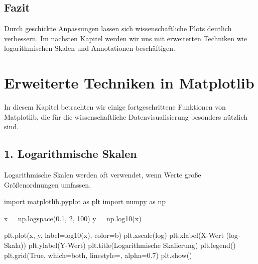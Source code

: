 \documentclass[
  letterpaper,
  DIV=11,
  numbers=noendperiod]{scrreprt}
\newenvironment{Shaded}{\begin{snugshade}}{\end{snugshade}}
\newcommand{\DecValTok}[1]{\textcolor[rgb]{0.68,0.00,0.00}{#1}}
\newcommand{\FloatTok}[1]{\textcolor[rgb]{0.68,0.00,0.00}{#1}}
\newcommand{\ImportTok}[1]{\textcolor[rgb]{0.00,0.46,0.62}{#1}}
\newcommand{\NormalTok}[1]{\textcolor[rgb]{0.00,0.23,0.31}{#1}}
\newcommand{\OperatorTok}[1]{\textcolor[rgb]{0.37,0.37,0.37}{#1}}
\newcommand{\StringTok}[1]{\textcolor[rgb]{0.13,0.47,0.30}{#1}}
\newcommand{\VariableTok}[1]{\textcolor[rgb]{0.07,0.07,0.07}{#1}}
\begin{document}
\section{Fazit}\label{fazit-1}

Durch geschickte Anpassungen lassen sich wissenschaftliche Plots
deutlich verbessern. Im nächsten Kapitel werden wir uns mit erweiterten
Techniken wie logarithmischen Skalen und Annotationen beschäftigen.

\chapter{Erweiterte Techniken in
Matplotlib}\label{erweiterte-techniken-in-matplotlib}

In diesem Kapitel betrachten wir einige fortgeschrittene Funktionen von
Matplotlib, die für die wissenschaftliche Datenvisualisierung besonders
nützlich sind.

\section{1. Logarithmische Skalen}\label{logarithmische-skalen}

Logarithmische Skalen werden oft verwendet, wenn Werte große
Größenordnungen umfassen.

\begin{Shaded}
\begin{Highlighting}[]
\ImportTok{import}\NormalTok{ matplotlib.pyplot }\ImportTok{as}\NormalTok{ plt}
\ImportTok{import}\NormalTok{ numpy }\ImportTok{as}\NormalTok{ np}

\NormalTok{x }\OperatorTok{=}\NormalTok{ np.logspace(}\FloatTok{0.1}\NormalTok{, }\DecValTok{2}\NormalTok{, }\DecValTok{100}\NormalTok{)}
\NormalTok{y }\OperatorTok{=}\NormalTok{ np.log10(x)}

\NormalTok{plt.plot(x, y, label}\OperatorTok{=}\StringTok{\textquotesingle{}log10(x)\textquotesingle{}}\NormalTok{, color}\OperatorTok{=}\StringTok{\textquotesingle{}b\textquotesingle{}}\NormalTok{)}
\NormalTok{plt.xscale(}\StringTok{\textquotesingle{}log\textquotesingle{}}\NormalTok{)}
\NormalTok{plt.xlabel(}\StringTok{\textquotesingle{}X{-}Wert (log{-}Skala)\textquotesingle{}}\NormalTok{)}
\NormalTok{plt.ylabel(}\StringTok{\textquotesingle{}Y{-}Wert\textquotesingle{}}\NormalTok{)}
\NormalTok{plt.title(}\StringTok{\textquotesingle{}Logarithmische Skalierung\textquotesingle{}}\NormalTok{)}
\NormalTok{plt.legend()}
\NormalTok{plt.grid(}\VariableTok{True}\NormalTok{, which}\OperatorTok{=}\StringTok{\textquotesingle{}both\textquotesingle{}}\NormalTok{, linestyle}\OperatorTok{=}\StringTok{\textquotesingle{}{-}{-}\textquotesingle{}}\NormalTok{, alpha}\OperatorTok{=}\FloatTok{0.7}\NormalTok{)}
\NormalTok{plt.show()}
\end{Highlighting}
\end{Shaded}
\end{document}
